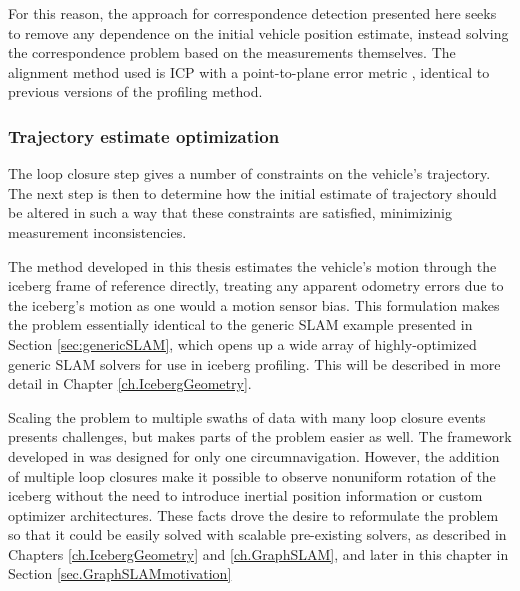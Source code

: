 For this reason, the approach for correspondence detection presented here seeks to remove any dependence on the initial vehicle position estimate, instead solving the correspondence problem based on the measurements themselves. The alignment method used is ICP with a point-to-plane error metric \cite{Gutmann1996}, identical to previous versions of the profiling method. 

\subsubsection{Trajectory estimate optimization}

The loop closure step gives a number of constraints on the vehicle's trajectory. The next step is then to determine how the initial estimate of trajectory should be altered in such a way that these constraints are satisfied, minimizinig measurement inconsistencies. 

The method developed in this thesis estimates the vehicle's motion through the iceberg frame of reference directly, treating any apparent odometry errors due to the iceberg's motion as one would a motion sensor bias. This formulation makes the problem essentially identical to the generic SLAM example presented in Section \ref{sec:genericSLAM}, which opens up a wide array of highly-optimized generic SLAM solvers for use in iceberg profiling. This will be described in more detail in Chapter \ref{ch.IcebergGeometry}.


Scaling the problem to multiple swaths of data with many loop closure events presents challenges, but makes parts of the problem easier as well. The framework developed in \cite{Kimball2011b} was designed for only one circumnavigation. However, the addition of multiple loop closures make it possible to observe nonuniform rotation of the iceberg without the need to introduce inertial position information or custom optimizer architectures. These facts drove the desire to reformulate the problem so that it could be easily solved with scalable pre-existing solvers, as described in Chapters \ref{ch.IcebergGeometry} and \ref{ch.GraphSLAM}, and later in this chapter in Section \ref{sec.GraphSLAMmotivation}

